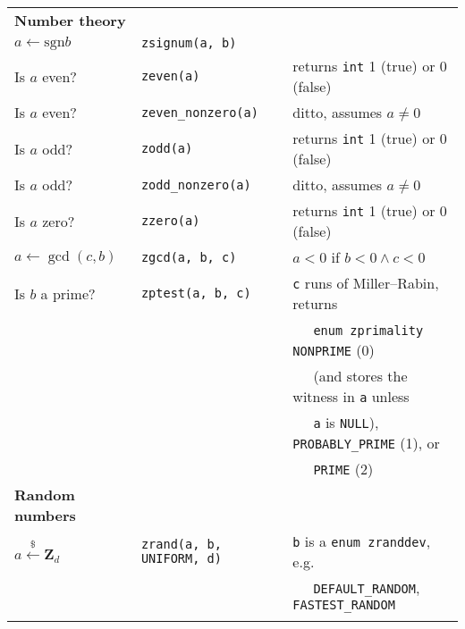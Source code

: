 \documentclass[10pt,draft]{article}
\newcommand{\entry}[3]{ #2 & {\tt #1} & #3 \\ }
\newcommand{\entrycont}[1]{ & & $~~~~~$ #1 \\ }
\newcommand{\entryTwo}[4]{\entry{#1}{#2}{#3}\entrycont{#4}}
\newcommand{\entryThree}[5]{\entryTwo{#1}{#2}{#3}{#4}\entrycont{#5}}
\newcommand{\entryFour}[6]{\entryThree{#1}{#2}{#3}{#4}{#5}\entrycont{#6}}
\newcommand{\entryFive}[7]{\entryFour{#1}{#2}{#3}{#4}{#5}{#6}\entrycont{#7}}
\begin{document}
\begin{tabular}{lll}
\textbf{Number theory} \\
\entry    {zsignum(a, b)}     {$a \gets \mbox{sgn} b$} {}
\entry    {zeven(a)}          {Is $a$ even?}           {returns {\tt int} 1 (true) or 0 (false)}
\entry    {zeven\_nonzero(a)} {Is $a$ even?}           {ditto, assumes $a \neq 0$}
\entry    {zodd(a)}           {Is $a$ odd?}            {returns {\tt int} 1 (true) or 0 (false)}
\entry    {zodd\_nonzero(a)}  {Is $a$ odd?}            {ditto, assumes $a \neq 0$}
\entry    {zzero(a)}          {Is $a$ zero?}           {returns {\tt int} 1 (true) or 0 (false)}
\entry    {zgcd(a, b, c)}     {$a \gets \gcd(c, b)$}   {$a < 0$ if $b < 0 \wedge c < 0$}
\entryFive{zptest(a, b, c)}   {Is $b$ a prime?}        {{\tt c} runs of Miller--Rabin, returns}
                                                       {{\tt enum zprimality} {\tt NONPRIME} (0)}
                                                       {(and stores the witness in {\tt a} unless}
                                                       {{\tt a} is {\tt NULL}), {\tt PROBABLY\_PRIME} (1), or}
                                                       {{\tt PRIME} (2)}

\textbf{Random numbers} \\
\entryTwo{zrand(a, b, UNIFORM, d)} {$a \xleftarrow{\$} \textbf{Z}_d$}
         {{\tt b} is a {\tt enum zranddev}, e.g.}
         {{\tt DEFAULT\_RANDOM}, {\tt FASTEST\_RANDOM}}
\\



\end{tabular}
\end{document}
